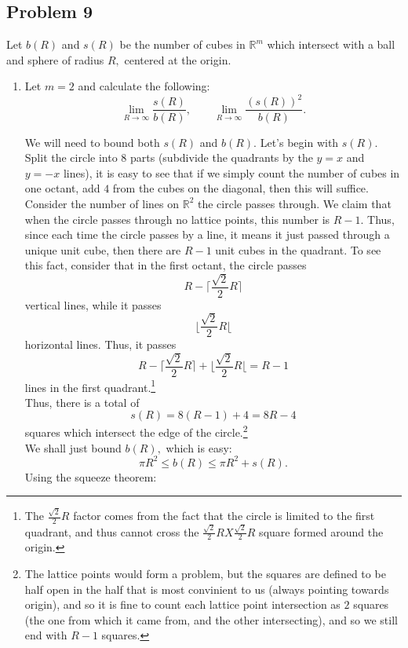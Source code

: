 \documentclass[11pt]{article}
\newcommand{\bbR}{\mathbb{R}}
\begin{document}
\begin{enumerate}
\newpage
\section*{Problem 9}
Let $b(R)$ and $s(R)$ be the number of cubes in $\bbR^m$ which intersect with a ball and sphere of radius $R,$ centered at the origin.
\begin{enumerate}
    \item \begin{problem}
        Let $m=2$ and calculate the following:
        \[\lim_{R\to \infty}\frac{s(R)}{b(R)}, \qquad \lim_{R\to \infty}\frac{(s(R))^2}{b(R)}.\]
    \end{problem}
    \begin{solution}
        We will need to bound both $s(R)$ and $b(R).$ Let's begin with $s(R).$ Split the circle into $8$ parts (subdivide the quadrants by the $y=x$ and $y=-x$ lines), it is easy to see that if we simply count the number of cubes in one octant, add $4$ from the cubes on the diagonal, then this will suffice.\\
        Consider the number of lines on $\bbR^2$ the circle passes through. We claim that when the circle passes through no lattice points, this number is $R-1.$ Thus, since each time the circle passes by a line, it means it just passed through a unique unit cube, then there are $R-1$ unit cubes in the quadrant. To see this fact, consider that in the first octant, the circle passes
        \[R - \lceil \frac{\sqrt{2}}{2}R\rceil\] vertical lines, while it passes
        \[\lfloor \frac{\sqrt{2}}{2}R \lfloor\] horizontal lines. Thus, it passes
        \[R - \lceil \frac{\sqrt{2}}{2}R\rceil + \lfloor \frac{\sqrt{2}}{2}R\lfloor = R- 1\] lines in the first quadrant.\footnote{The $\frac{\sqrt{2}}{2}R$ factor comes from the fact that the circle is limited to the first quadrant, and thus cannot cross the $\frac{\sqrt{2}}{2}R X \frac{\sqrt{2}}{2}R$ square formed around the origin.}\\
        Thus, there is a total of \[s(R) = 8(R-1) + 4 = 8R-4\] squares which intersect the edge of the circle.\footnote{The lattice points would form a problem, but the squares are defined to be half open in the half that is most convinient to us (always pointing towards origin), and so it is fine to count each lattice point intersection as $2$ squares (the one from which it came from, and the other intersecting), and so we still end with $R-1$ squares.}\\
        We shall just bound $b(R),$ which is easy:
        \[\pi R^2 \leq b(R) \leq \pi R^2 + s(R).\] Using the squeeze theorem:

\end{solution}
\end{enumerate}
\end{enumerate}
\end{document}
